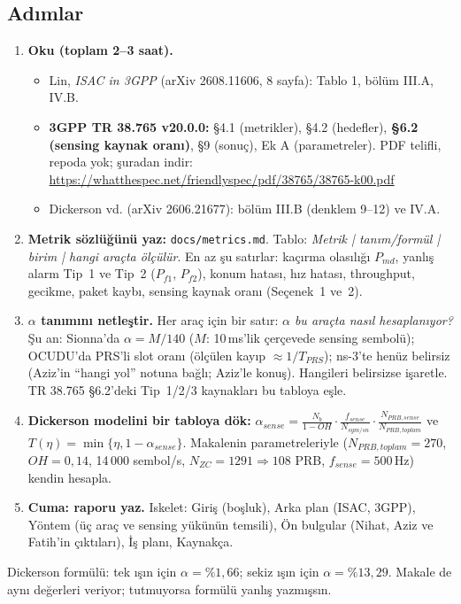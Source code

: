 \documentclass[10.5pt,a4paper]{article}
\begin{document}
\subsection*{Adımlar}
\begin{enumerate}[leftmargin=1.6em]
\item \textbf{Oku (toplam 2--3 saat).}
  \begin{itemize}
  \item Lin, \emph{ISAC in 3GPP} (arXiv 2608.11606, 8 sayfa): Tablo 1, bölüm III.A, IV.B.
  \item \textbf{3GPP TR 38.765 v20.0.0:} §4.1 (metrikler), §4.2 (hedefler), \textbf{§6.2 (sensing kaynak oranı)}, §9 (sonuç), Ek A (parametreler). PDF telifli, repoda yok; şuradan indir: \url{https://whatthespec.net/friendlyspec/pdf/38765/38765-k00.pdf}
  \item Dickerson vd. (arXiv 2606.21677): bölüm III.B (denklem 9--12) ve IV.A.
  \end{itemize}
\item \textbf{Metrik sözlüğünü yaz:} \texttt{docs/metrics.md}. Tablo: \emph{Metrik | tanım/formül | birim | hangi araçta ölçülür}. En az şu satırlar: kaçırma olasılığı $P_{md}$, yanlış alarm Tip~1 ve Tip~2 ($P_{f1}$, $P_{f2}$), konum hatası, hız hatası, throughput, gecikme, paket kaybı, sensing kaynak oranı (Seçenek~1 ve~2).
\item \textbf{$\alpha$ tanımını netleştir.} Her araç için bir satır: \emph{$\alpha$ bu araçta nasıl hesaplanıyor?} Şu an: Sionna'da $\alpha = M/140$ ($M$: 10\,ms'lik çerçevede sensing sembolü); OCUDU'da PRS'li slot oranı (ölçülen kayıp $\approx 1/T_{PRS}$); ns-3'te henüz belirsiz (Aziz'in ``hangi yol'' notuna bağlı; Aziz'le konuş). Hangileri belirsizse işaretle. TR 38.765 §6.2'deki Tip~1/2/3 kaynakları bu tabloya eşle.
\item \textbf{Dickerson modelini bir tabloya dök:} $\alpha_{sense} = \frac{N_b}{1-OH}\cdot\frac{f_{sense}}{N_{sym/sn}}\cdot\frac{N_{PRB,sense}}{N_{PRB,toplam}}$ ve $T(\eta)=\min\{\eta,1-\alpha_{sense}\}$. Makalenin parametreleriyle ($N_{PRB,toplam}=270$, $OH=0{,}14$, 14\,000 sembol/s, $N_{ZC}=1291\Rightarrow108$ PRB, $f_{sense}=500$\,Hz) kendin hesapla.
\item \textbf{Cuma: raporu yaz.} Iskelet: Giriş (boşluk), Arka plan (ISAC, 3GPP), Yöntem (üç araç ve sensing yükünün temsili), Ön bulgular (Nihat, Aziz ve Fatih'in çıktıları), İş planı, Kaynakça.
\end{enumerate}

\begin{kontrol}
Dickerson formülü: tek ışın için $\alpha=\%1{,}66$; sekiz ışın için $\alpha=\%13{,}29$. Makale de aynı değerleri veriyor; tutmuyorsa formülü yanlış yazmışsın.
\end{kontrol}
\end{document}
